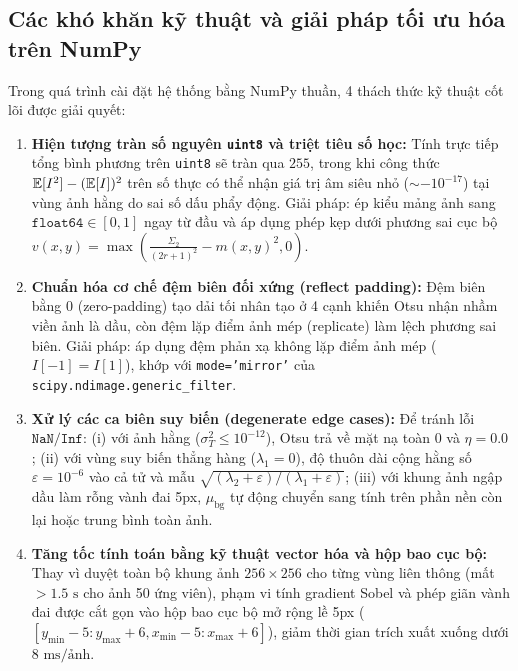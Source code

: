 \subsection{Các khó khăn kỹ thuật và giải pháp tối ưu hóa trên NumPy}

Trong quá trình cài đặt hệ thống bằng NumPy thuần, 4 thách thức kỹ thuật cốt lõi được giải quyết:
\begin{enumerate}
    \item \textbf{Hiện tượng tràn số nguyên \texttt{uint8} và triệt tiêu số học:}
    Tính trực tiếp tổng bình phương trên \texttt{uint8} sẽ tràn qua $255$, trong khi công thức $\mathbb{E}[I^2] - (\mathbb{E}[I])^2$ trên số thực có thể nhận giá trị âm siêu nhỏ ($\sim -10^{-17}$) tại vùng ảnh hằng do sai số dấu phẩy động. Giải pháp: ép kiểu mảng ảnh sang $\texttt{float64} \in [0, 1]$ ngay từ đầu và áp dụng phép kẹp dưới phương sai cục bộ $v(x, y) = \max\left( \frac{\Sigma_2}{(2r+1)^2} - m(x, y)^2, 0 \right)$.
    \item \textbf{Chuẩn hóa cơ chế đệm biên đối xứng (reflect padding):}
    Đệm biên bằng $0$ (zero-padding) tạo dải tối nhân tạo ở 4 cạnh khiến Otsu nhận nhầm viền ảnh là dầu, còn đệm lặp điểm ảnh mép (replicate) làm lệch phương sai biên. Giải pháp: áp dụng đệm phản xạ không lặp điểm ảnh mép ($I[-1] = I[1]$), khớp với \texttt{mode='mirror'} của \texttt{scipy.ndimage.generic\_filter}.
    \item \textbf{Xử lý các ca biên suy biến (degenerate edge cases):}
    Để tránh lỗi $\texttt{NaN} / \texttt{Inf}$: (i) với ảnh hằng ($\sigma_T^2 \le 10^{-12}$), Otsu trả về mặt nạ toàn $0$ và $\eta = 0.0$; (ii) với vùng suy biến thẳng hàng ($\lambda_1 = 0$), độ thuôn dài cộng hằng số $\varepsilon = 10^{-6}$ vào cả tử và mẫu $\sqrt{(\lambda_2 + \varepsilon)/(\lambda_1 + \varepsilon)}$; (iii) với khung ảnh ngập dầu làm rỗng vành đai 5px, $\mu_{\text{bg}}$ tự động chuyển sang tính trên phần nền còn lại hoặc trung bình toàn ảnh.
    \item \textbf{Tăng tốc tính toán bằng kỹ thuật vector hóa và hộp bao cục bộ:}
    Thay vì duyệt toàn bộ khung ảnh $256 \times 256$ cho từng vùng liên thông (mất $>1.5\text{ s}$ cho ảnh 50 ứng viên), phạm vi tính gradient Sobel và phép giãn vành đai được cắt gọn vào hộp bao cục bộ mở rộng lề 5px ($[y_{\min}-5 : y_{\max}+6, x_{\min}-5 : x_{\max}+6]$), giảm thời gian trích xuất xuống dưới $8\text{ ms/ảnh}$.
\end{enumerate}
